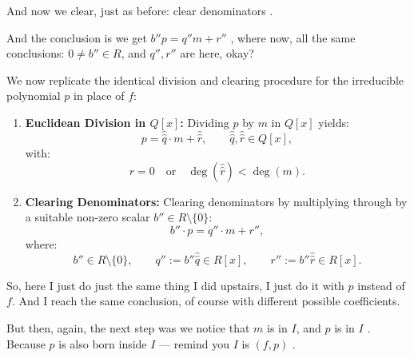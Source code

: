 \begin{proofWrapper}
\begin{speech}[00:29:04 - 00:30:34]
And now we clear, just as before: clear denominators .

And the conclusion is we get $b'' p = q'' m + r''$ , where now, all the same conclusions: $0 \neq b'' \in R$, and $q'', r''$ are here, okay? 
\end{speech}

\begin{content}
We now replicate the identical division and clearing procedure for the irreducible polynomial $p$ in place of $f$:
\begin{enumerate}[label=\textbf{(\arabic*)}]
    \item \textbf{Euclidean Division in $Q[x]$:}
    Dividing $p$ by $m$ in $Q[x]$ yields:
    \begin{equation}\label{eq:div-p-m-Qx}
    p = \hat{\hat{q}} \cdot m + \hat{\hat{r}}, \qquad \hat{\hat{q}}, \hat{\hat{r}} \in Q[x],
    \end{equation}
    with:
    \begin{equation}\label{eq:rem-cond-p}
    \hat{\hat{r}} = 0 \quad \text{or} \quad \deg(\hat{\hat{r}}) < \deg(m).
    \end{equation}
    \item \textbf{Clearing Denominators:}
    Clearing denominators by multiplying through by a suitable non-zero scalar $b'' \in R \setminus \{0\}$:
    \begin{equation}\label{eq:cleared-div-p}
    b'' \cdot p = q'' \cdot m + r'',
    \end{equation}
    where:
    \begin{equation}\label{eq:cleared-coeffs-p}
    b'' \in R \setminus \{0\}, \qquad q'' := b'' \hat{\hat{q}} \in R[x], \qquad r'' := b'' \hat{\hat{r}} \in R[x].
    \end{equation}
\end{enumerate}
\end{content}

\begin{speech}[00:30:34 - 00:31:52]
So, here I just do just the same thing I did upstairs, I just do it with $p$ instead of $f$. And I reach the same conclusion, of course with different possible coefficients.

But then, again, the next step was we notice that $m$ is in $I$, and $p$ is in $I$ . Because $p$ is also born inside $I$ --- remind you $I$ is $(f, p)$ .


\end{speech}
\end{proofWrapper}
